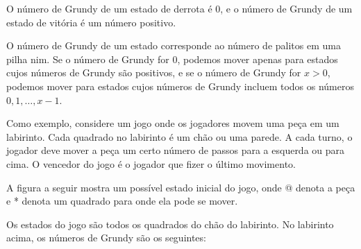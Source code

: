 O número de Grundy de um estado de derrota é 0, e o número de Grundy de um estado de vitória é um número positivo.

O número de Grundy de um estado corresponde ao número de palitos em uma pilha nim. Se o número de Grundy for 0, podemos mover apenas para estados cujos números de Grundy são positivos, e se o número de Grundy for $x>0$, podemos mover para estados cujos números de Grundy incluem todos os números $0,1,\ldots,x-1$.

Como exemplo, considere um jogo onde os jogadores movem uma peça em um labirinto. Cada quadrado no labirinto é um chão ou uma parede. A cada turno, o jogador deve mover a peça um certo número de passos para a esquerda ou para cima. O vencedor do jogo é o jogador que fizer o último movimento.

A figura a seguir mostra um possível estado inicial do jogo, onde @ denota a peça e * denota um quadrado para onde ela pode se mover.

\begin{center}
\end{center}

Os estados do jogo são todos os quadrados do chão do labirinto. No labirinto acima, os números de Grundy são os seguintes:


